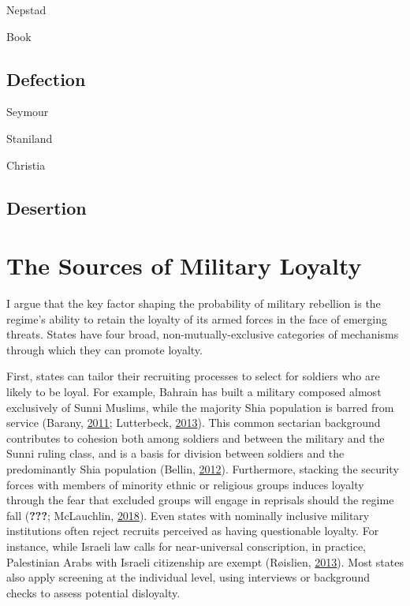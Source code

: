 \documentclass[
  12pt,
]{article}
\begin{document}
Nepstad

Book

\hypertarget{defection}{%
\subsection{Defection}\label{defection}}

Seymour

Staniland

Christia

\hypertarget{desertion}{%
\subsection{Desertion}\label{desertion}}

\hypertarget{the-sources-of-military-loyalty}{%
\section{The Sources of Military Loyalty}\label{the-sources-of-military-loyalty}}

I argue that the key factor shaping the probability of military rebellion is the regime's ability to retain the loyalty of its armed forces in the face of emerging threats. States have four broad, non-mutually-exclusive categories of mechanisms through which they can promote loyalty.

First, states can tailor their recruiting processes to select for soldiers who are likely to be loyal. For example, Bahrain has built a military composed almost exclusively of Sunni Muslims, while the majority Shia population is barred from service (Barany, \protect\hyperlink{ref-Barany2011}{2011}; Lutterbeck, \protect\hyperlink{ref-Lutterbeck2013}{2013}). This common sectarian background contributes to cohesion both among soldiers and between the military and the Sunni ruling class, and is a basis for division between soldiers and the predominantly Shia population (Bellin, \protect\hyperlink{ref-Bellin2012}{2012}). Furthermore, stacking the security forces with members of minority ethnic or religious groups induces loyalty through the fear that excluded groups will engage in reprisals should the regime fall ({\textbf{???}}; McLauchlin, \protect\hyperlink{ref-McLauchlin2018}{2018}). Even states with nominally inclusive military institutions often reject recruits perceived as having questionable loyalty. For instance, while Israeli law calls for near-universal conscription, in practice, Palestinian Arabs with Israeli citizenship are exempt (Røislien, \protect\hyperlink{ref-Roislien2013}{2013}). Most states also apply screening at the individual level, using interviews or background checks to assess potential disloyalty.
\end{document}
